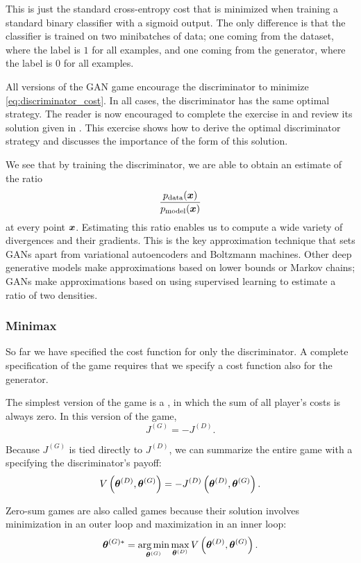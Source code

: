 This is just the standard cross-entropy cost that is minimized when training a standard binary classifier
with a sigmoid output.
The only difference is that the classifier is trained on two minibatches of data; one coming from the
dataset, where the label is $1$ for all examples, and one coming from the generator, where the label
is $0$ for all examples.

All versions of the GAN game encourage the discriminator to minimize \eqref{eq:discriminator_cost}.
In all cases, the discriminator has the same optimal strategy.
The reader is now encouraged to complete the exercise in  and review its solution
given in . This exercise shows how to derive the optimal discriminator strategy
and discusses the importance of the form of this solution.

We see that by training the discriminator, we are able to obtain an estimate of the ratio
\[
  \frac{p_{\rm{data}}({\bm{x}})}{p_{\rm{model}}({\bm{x}})}
\]
at every point ${\bm{x}}$.
Estimating this ratio enables us to compute a wide variety of divergences and their gradients.
This is the key approximation technique that sets GANs apart from variational autoencoders
and Boltzmann machines.
Other deep generative models make approximations based on lower bounds or Markov chains;
GANs make approximations based on using supervised learning to estimate a ratio of two densities.


\subsubsection{Minimax}

So far we have specified the cost function for only the discriminator.
A complete specification of the game requires that we specify a cost function also
for the generator.

The simplest version of the game is a , in which the sum of all player's
costs is always zero.
In this version of the game,
\begin{equation}
J^{(G)} = - J^{(D)}.
\label{eq:minimax}
\end{equation}

Because $J^{(G)}$ is tied directly to $J^{(D)}$, we can summarize the entire game with a
 specifying the discriminator's payoff:
\[ V\left({\bm{\theta}}^{(D)}, {\bm{\theta}}^{(G)} \right) = - J^{(D)} \left({\bm{\theta}}^{(D)}, {\bm{\theta}}^{(G)} \right).\]

Zero-sum games are also called  games because their solution involves minimization
in an outer loop and maximization in an inner loop:
\[ {\bm{\theta}}^{(G)*} = \operatorname*{arg\,min}_{{\bm{\theta}}^{(G)}} \max_{{\bm{\theta}}^{(D)}} V\left({\bm{\theta}}^{(D)}, {\bm{\theta}}^{(G)} \right) . \]

